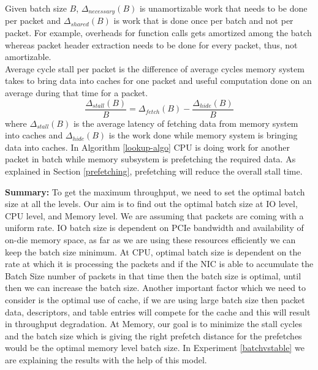 Given batch size $B$, $\Delta_{necessary}(B)$ is unamortizable work that needs to be done per packet and $\Delta_{shared}(B)$ is work that is done once per batch and not per packet. For example, overheads for function calls gets amortized among the batch whereas packet header extraction needs to be done for every packet, thus, not amortizable.
\\
Average cycle stall per packet is the difference of average cycles memory system takes to bring data into caches for one packet and useful computation done on an average during that time for a packet.
\\
\begin{equation}
\label{cycles_stall}
\frac{\Delta_{stall}(B)}{B} = \Delta_{fetch}(B) - \frac{\Delta_{hide}(B)}{B}
\end{equation}
where $\Delta_{stall}(B)$ is the average latency of fetching data from memory system into caches and $\Delta_{hide}(B)$ is the work done while memory system is bringing data into caches. In Algorithm \ref{lookup-algo} CPU is doing work for another packet in batch while memory subsystem is prefetching the required data. As explained in Section \ref{prefetching}, prefetching will reduce the overall stall time.

\textbf{Summary:} To get the maximum throughput, we need to set the optimal batch size at all the levels. Our aim is to find out the optimal batch size at IO level, CPU level, and Memory level. We are assuming that packets are coming with a uniform rate. IO batch size is dependent on PCIe bandwidth and availability of on-die memory space, as far as we are using these resources efficiently we can keep the batch size minimum. At CPU, optimal batch size is dependent on the rate at which it is processing the packets and if the NIC is able to accumulate the Batch Size number of packets in that time then the batch size is optimal, until then we can increase the batch size. Another important factor which we need to consider is the optimal use of cache, if we are using large batch size then packet data, descriptors, and table entries will compete for the cache and this will result in throughput degradation. At Memory, our goal is to minimize the stall cycles and the batch size which is giving the right prefetch distance for the prefetches would be the optimal memory level batch size. In Experiment \ref{batchvstable} we are explaining the results with the help of this model.